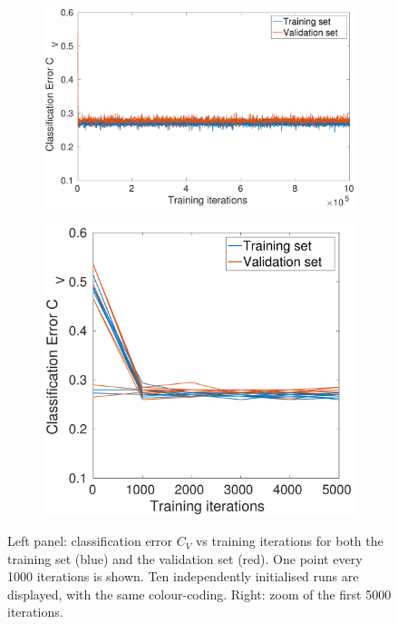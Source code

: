 \documentclass[12pt,titlepage]{article}
\begin{document}
\vspace*{-0.2cm}
\begin{figure}[H]
\centering
    \begin{subfigure}[b]{0.58\textwidth}
        \includegraphics[width=\textwidth]{../Figures/noHL_error.pdf}
        \caption{}
    \end{subfigure} %
    \hfill %
    \begin{subfigure}[b]{0.4\textwidth}
        \includegraphics[width=\textwidth]{../Figures/noHL_error_focus.pdf}
        \caption{}
    \end{subfigure} %
\caption{\footnotesize Left panel: classification error $C_V$ vs training iterations for both the training set (blue) and the validation set (red). One point every 1000 iterations is shown. Ten independently initialised runs are displayed, with the same colour-coding. Right: zoom of the first 5000 iterations.}
\label{fig:2b}
\end{figure}
\end{document}
